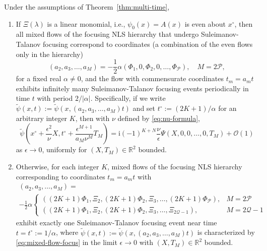\documentclass[12pt]{amsart}
\numberwithin{equation}{section}
\newcommand{\ii}{\mathrm{i}}
\newcommand{\SP}{\lambda}
\newcommand{\phaseint}{\Phi}
\newcommand{\tailint}{\Xi}
\newcommand{\eps}{\epsilon}
\newcommand{\bigo}[1]{ \mathcal{O}\! \left( #1 \right) }
\begin{document}
\begin{thm}
Under the assumptions of Theorem~\ref{thm:multi-time}, 
\begin{enumerate}
\item If $\tailint(\SP)$ is a linear monomial, i.e., $\psi_0(x)=A(x)$ is even about $x^\circ$, then 
all mixed flows of the focusing NLS hierarchy that undergo Suleimanov-Talanov focusing correspond to  coordinates (a combination of the even flows only in the hierarchy)
\begin{equation}
(a_2,a_3,\dots,a_M)=-\frac{1}{2}\alpha\left(\phaseint_1,0,\phaseint_2,0,\dots,\phaseint_\mathcal{P}\right),\quad M=2\mathcal{P},
\end{equation}
for a fixed real $\alpha\neq 0$, and the flow with commensurate coordinates $t_m=a_mt$ exhibits infinitely many Suleimanov-Talanov focusing events periodically in time $t$ with period $2/|\alpha|$.  Specifically,
if we write $\widetilde{\psi}(x,t):=\widetilde{\psi}(x,(a_2,a_3,\dots,a_M)t)$ and set $t^\circ:=(2K+1)/\alpha$ for an arbitrary integer $K$, then with $\nu$ defined by \eqref{eq:nu-formula},
\begin{equation}
\widetilde{\psi}\left(x^\circ+\frac{\epsilon^2}{\nu}X,t^\circ + \frac{\epsilon^{M+1}}{a_M\nu^M}T_M\right)= \ii (-1)^{K+N} \frac{\nu}{\eps}\Psi(X,0,0,\dots,0,T_M) + \bigo{1}
\label{eq:mixed-flow-focus}
\end{equation}
as $\eps\to 0$, uniformly for $(X,T_M)\in\mathbb{R}^2$ bounded.  
\item Otherwise, for each integer $K$, mixed flows of the focusing NLS hierarchy corresponding to coordinates $t_m=a_mt$ with
\begin{multline}
(a_2,a_3,\dots,a_M)=\\-\frac{1}{2}\alpha\begin{cases}\left((2K+1)\phaseint_1,\tailint_2,(2K+1)\phaseint_2,\tailint_3,\dots,(2K+1)\phaseint_\mathcal{P}\right), &M=2\mathcal{P}\\
\left((2K+1)\phaseint_1,\tailint_2,(2K+1)\phaseint_2,\tailint_3,\dots,\tailint_{2\mathcal{Q}-1}\right),& M=2\mathcal{Q}-1
\end{cases}
\end{multline}
exhibit exactly one Suleimanov-Talanov focusing event near time $t=t^\circ:=1/\alpha$, where $\widetilde{\psi}(x,t):=\widetilde{\psi}(x,(a_2,a_3,\dots,a_M)t)$ is characterized by \eqref{eq:mixed-flow-focus} in the limit $\eps\to 0$ with $(X,T_M)\in\mathbb{R}^2$ bounded.
\end{enumerate}
\label{thm:mixture}
\end{thm}
\end{document}
